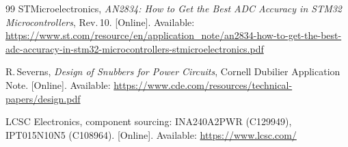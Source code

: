\documentclass[journal,onecolumn,11pt]{IEEEtran}
\begin{document}
\begin{thebibliography}{99}
 STMicroelectronics, \emph{AN2834: How to Get the Best ADC Accuracy in STM32 Microcontrollers}, Rev.\,10. [Online]. Available: \url{https://www.st.com/resource/en/application_note/an2834-how-to-get-the-best-adc-accuracy-in-stm32-microcontrollers-stmicroelectronics.pdf}

 R.\,Severns, \emph{Design of Snubbers for Power Circuits}, Cornell Dubilier Application Note. [Online]. Available: \url{https://www.cde.com/resources/technical-papers/design.pdf}

 LCSC Electronics, component sourcing: INA240A2PWR (C129949), IPT015N10N5 (C108964). [Online]. Available: \url{https://www.lcsc.com/}

\end{thebibliography}
\end{document}
